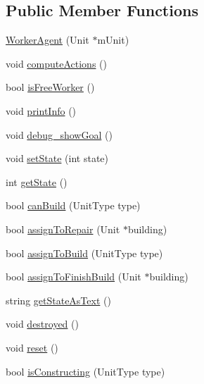 \subsection*{Public Member Functions}
\begin{DoxyCompactItemize}
\item 
\hyperlink{class_worker_agent_a1c55c8206ca0def86c6478ac98d7f2de}{Worker\-Agent} (Unit $\ast$m\-Unit)
\item 
void \hyperlink{class_worker_agent_a9bf641c8747b567dd62b4d1d496b492d}{compute\-Actions} ()
\item 
bool \hyperlink{class_worker_agent_a915eac0b771494a8e1ca03d04e986ac0}{is\-Free\-Worker} ()
\item 
void \hyperlink{class_worker_agent_accc6df915044157f38f1937c2c787d3e}{print\-Info} ()
\item 
void \hyperlink{class_worker_agent_a53f907fd51fa4ddefb3c0f165bce82fb}{debug\-\_\-show\-Goal} ()
\item 
void \hyperlink{class_worker_agent_a78cd553e1df561f11afc71b2eb918835}{set\-State} (int state)
\item 
int \hyperlink{class_worker_agent_ae0bdc1cb52a7cd5643af16d217c3bf47}{get\-State} ()
\item 
bool \hyperlink{class_worker_agent_af185b1df9bcd14cebb6cc39f4d19fb2b}{can\-Build} (Unit\-Type type)
\item 
bool \hyperlink{class_worker_agent_afedb96096579720d6b9cf9577e621272}{assign\-To\-Repair} (Unit $\ast$building)
\item 
bool \hyperlink{class_worker_agent_a74313cf2cb466b680ad3e67aa6533962}{assign\-To\-Build} (Unit\-Type type)
\item 
bool \hyperlink{class_worker_agent_a82af6ee8c50ab752618c0e9079f1a91e}{assign\-To\-Finish\-Build} (Unit $\ast$building)
\item 
string \hyperlink{class_worker_agent_a2ae840cfc4dfb11ed76459453656e020}{get\-State\-As\-Text} ()
\item 
void \hyperlink{class_worker_agent_a53cd5eb9a92d2fa9922106d2d2b3f28c}{destroyed} ()
\item 
void \hyperlink{class_worker_agent_abc0ce86cbacb5de7b4fd0ae79ddb780b}{reset} ()
\item 
bool \hyperlink{class_worker_agent_ac440df9dc188e9d78113a78a732bef8a}{is\-Constructing} (Unit\-Type type)
\end{DoxyCompactItemize}
